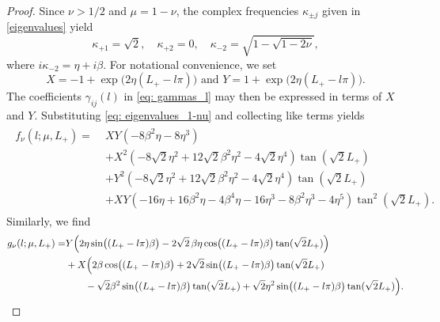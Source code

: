 \documentclass{article}
\numberwithin{equation}{section}
\begin{document}
		\begin{proof}			
			Since $\nu > 1/2$ and $\mu = 1-\nu$, the complex frequencies $\kappa_{\pm j}$ given in \eqref{eigenvalues} yield
			\begin{equation}\label{eq: eigenvalues_1-nu}
				\kappa_{+1}= \sqrt{2}, \quad \kappa_{+2} = 0, \quad \kappa_{-2} = \sqrt{1 - \sqrt{1-2\nu}},
			\end{equation}
			where $i\kappa_{-2} = \eta + i\beta$. For notational convenience, we set 
			\begin{equation}
				X = -1 + \exp\bigl(2\eta(L_+ - l\pi)\bigr)
				\text{ and }
				Y = 1 + \exp\bigl(2\eta(L_+ - l\pi)\bigr).
			\end{equation}
			The coefficients $\gamma_{ij}(l)$ in \eqref{eq: gammas_l} may then be expressed in terms of $X$ and $Y$. Substituting \eqref{eq: eigenvalues_1-nu} and collecting like terms yields
			\begin{align} \label{eq: f_1-nu}
				\begin{split}
					f_\nu (l; \mu,L_+) =\;& XY(-8\beta^2\eta - 8\eta^3) \\
					&+ X^2(-8\sqrt{2}\eta^2 + 12\sqrt{2}\beta^2\eta^2 - 4\sqrt{2}\eta^4)\tan(\sqrt{2}L_+) \\
					&+ Y^2(-8\sqrt{2}\eta^2 + 12\sqrt{2}\beta^2\eta^2 - 4\sqrt{2}\eta^4)\tan(\sqrt{2}L_+) \\
					&+ XY(-16\eta + 16\beta^2\eta - 4\beta^4\eta - 16\eta^3 - 8\beta^2\eta^3 - 4\eta^5)
					\tan^2(\sqrt{2}L_+).
				\end{split}
			\end{align}
			Similarly, we find
			\begin{align}\label{eq: g_1-nu}
				\begin{split}
					g_\nu (l; \mu,L_+) = &Y\Bigl(2\eta \sin\bigl((L_+ - l\pi)\beta\bigr)
					- 2\sqrt{2}\,\beta\eta \cos\bigl((L_+ - l\pi)\beta\bigr)\tan(\sqrt{2}L_+)\Bigr) \\
					&+ X\Bigl(2\beta \cos\bigl((L_+ - l\pi)\beta\bigr)
					+ 2\sqrt{2}\sin\bigl((L_+ - l\pi)\beta\bigr)\tan(\sqrt{2}L_+) \\
					&\qquad - \sqrt{2}\beta^2 \sin\bigl((L_+ - l\pi)\beta\bigr)\tan(\sqrt{2}L_+)
					+ \sqrt{2}\eta^2 \sin\bigl((L_+ - l\pi)\beta\bigr)\tan(\sqrt{2}L_+)\Bigr).
				\end{split}
			\end{align}
			

\end{proof}
\end{document}

